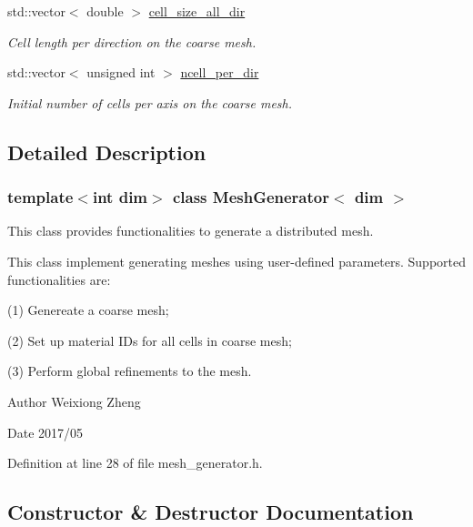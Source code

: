 \begin{DoxyCompactItemize}
std\+::vector$<$ double $>$ \hyperlink{class_mesh_generator_a55a1699f8cdb9418486af6b0fa3487cc}{cell\+\_\+size\+\_\+all\+\_\+dir}
\begin{DoxyCompactList}\small\item\em Cell length per direction on the coarse mesh. \end{DoxyCompactList}\item 
std\+::vector$<$ unsigned int $>$ \hyperlink{class_mesh_generator_a4d73b2d6a3f66e8a696e2228dc53fb76}{ncell\+\_\+per\+\_\+dir}
\begin{DoxyCompactList}\small\item\em Initial number of cells per axis on the coarse mesh. \end{DoxyCompactList}\end{DoxyCompactItemize}


\subsection{Detailed Description}
\subsubsection*{template$<$int dim$>$\newline
class Mesh\+Generator$<$ dim $>$}

This class provides functionalities to generate a distributed mesh. 

This class implement generating meshes using user-\/defined parameters. Supported functionalities are\+:

(1) Genereate a coarse mesh;

(2) Set up material I\+Ds for all cells in coarse mesh;

(3) Perform global refinements to the mesh.

\begin{DoxyAuthor}{Author}
Weixiong Zheng 
\end{DoxyAuthor}
\begin{DoxyDate}{Date}
2017/05 
\end{DoxyDate}


Definition at line 28 of file mesh\+\_\+generator.\+h.



\subsection{Constructor \& Destructor Documentation}
\mbox{\label{class_mesh_generator_aaf711e4f4d1702dd2f91b8dc3d425765}} 
